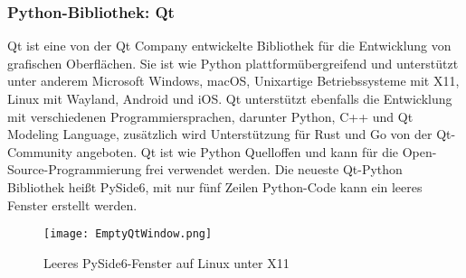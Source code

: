 \subsubsection{Python-Bibliothek: Qt}
\label{subsubsec:tQt}
Qt ist eine von der Qt Company entwickelte Bibliothek für die Entwicklung von grafischen Oberflächen. Sie ist wie Python plattformübergreifend und unterstützt unter anderem Microsoft Windows, macOS, Unixartige Betriebssysteme mit X11, Linux mit Wayland, Android und iOS. Qt unterstützt ebenfalls die Entwicklung mit verschiedenen Programmiersprachen, darunter Python, C++ und Qt Modeling Language, zusätzlich wird Unterstützung für Rust und Go von der Qt-Community angeboten. Qt ist wie Python Quelloffen und kann für die Open-Source-Programmierung frei verwendet werden. Die neueste Qt-Python Bibliothek heißt PySide6, mit nur fünf Zeilen Python-Code kann ein leeres Fenster erstellt werden.
\begin{figure}[h]
\centering
\texttt{[image: EmptyQtWindow.png]}
\caption{Leeres PySide6-Fenster auf Linux unter X11}
\label{fig:EmptyQtWindow}
\end{figure}

